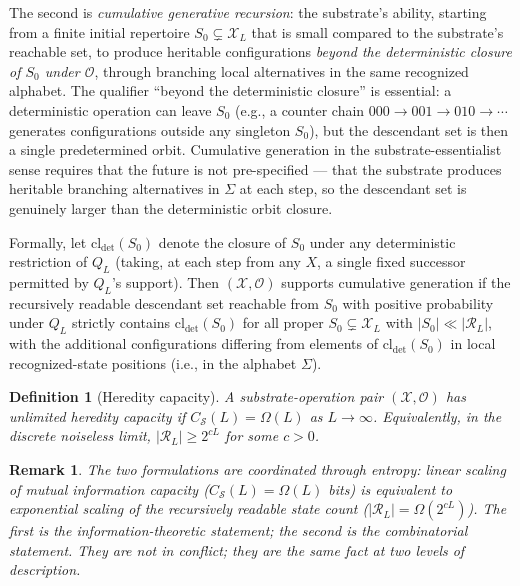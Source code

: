 \documentclass[aps,prx,reprint,amsmath,amssymb,floatfix,superscriptaddress,nofootinbib]{revtex4-2}
\theoremstyle{plain-thm}
\theoremstyle{definition-thm}
\newtheorem{definition}[theorem]{Definition}
\newtheorem{remark}[theorem]{Remark}
\newcommand{\Csub}{C_{\mathcal{S}}}
\newcommand{\Xset}{\mathcal{X}}
\newcommand{\Op}{\mathcal{O}}
\newcommand{\Reach}{\mathcal{R}}
\begin{document}
The second is \emph{cumulative generative recursion}: the substrate's ability, starting from a finite initial repertoire $S_0 \subsetneq \Xset_L$ that is small compared to the substrate's reachable set, to produce heritable configurations \emph{beyond the deterministic closure of $S_0$ under $\Op$}, through branching local alternatives in the same recognized alphabet. The qualifier ``beyond the deterministic closure'' is essential: a deterministic operation can leave $S_0$ (e.g., a counter chain $000 \to 001 \to 010 \to \cdots$ generates configurations outside any singleton $S_0$), but the descendant set is then a single predetermined orbit. Cumulative generation in the substrate-essentialist sense requires that the future is not pre-specified --- that the substrate produces heritable branching alternatives in $\Sigma$ at each step, so the descendant set is genuinely larger than the deterministic orbit closure.

Formally, let $\mathrm{cl}_{\det}(S_0)$ denote the closure of $S_0$ under any deterministic restriction of $Q_L$ (taking, at each step from any $X$, a single fixed successor permitted by $Q_L$'s support). Then $(\Xset, \Op)$ supports cumulative generation if the recursively readable descendant set reachable from $S_0$ with positive probability under $Q_L$ strictly contains $\mathrm{cl}_{\det}(S_0)$ for all proper $S_0 \subsetneq \Xset_L$ with $|S_0| \ll |\Reach_L|$, with the additional configurations differing from elements of $\mathrm{cl}_{\det}(S_0)$ in local recognized-state positions (i.e., in the alphabet $\Sigma$).

\begin{definition}[Heredity capacity]
\label{def:capacity}
A substrate-operation pair $(\Xset, \Op)$ has \textnormal{unlimited heredity capacity} if $\Csub(L) = \Omega(L)$ as $L \to \infty$. Equivalently, in the discrete noiseless limit, $|\Reach_L| \ge 2^{cL}$ for some $c > 0$.
\end{definition}

\begin{remark}
The two formulations are coordinated through entropy: linear scaling of mutual information capacity ($\Csub(L) = \Omega(L)$ bits) is equivalent to exponential scaling of the recursively readable state count ($|\Reach_L| = \Omega(2^{cL})$). The first is the information-theoretic statement; the second is the combinatorial statement. They are not in conflict; they are the same fact at two levels of description.
\end{remark}
\end{document}
